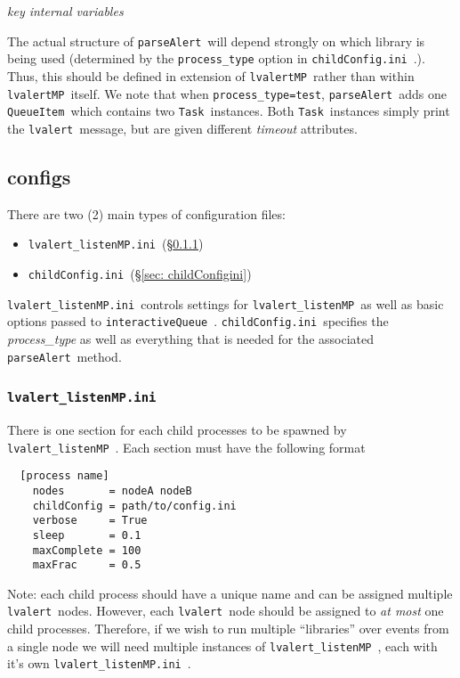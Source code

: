 \documentclass{article}
\newcommand{\alert}{\texttt{lvalert}~}
\newcommand{\lvalertMP}{\texttt{lvalertMP}~}
\newcommand{\lvalertListenMP}{\texttt{lvalert\_listenMP}~}
\newcommand{\interactiveQueue}{\texttt{interactiveQueue}~}
\newcommand{\parseAlert}{\texttt{parseAlert}~}
\newcommand{\QueueItem}{\texttt{QueueItem}~}
\newcommand{\Task}{\texttt{Task}~}
\newcommand{\lvalertMPini}{\texttt{lvalert\_listenMP.ini}~}
\newcommand{\childConfigini}{\texttt{childConfig.ini}~}
\begin{document}
\noindent
\textit{key internal variables}

The actual structure of \parseAlert will depend strongly on which library is being used (determined by the \texttt{process\_type} option in \childConfigini.). 
Thus, this should be defined in extension of \lvalertMP rather than within \lvalertMP itself.
We note that when \texttt{process\_type=test}, \parseAlert adds one \QueueItem which contains two \Task instances. 
Both \Task instances simply print the \alert message, but are given different \textit{timeout} attributes.


\subsection{configs}
\label{sec: configs}

There are two (2) main types of configuration files:

\begin{itemize}
    \item{\lvalertMPini (\S\ref{sec: lvalertMPini})}
    \item{\childConfigini (\S\ref{sec: childConfigini})}
\end{itemize}

\lvalertMPini controls settings for \lvalertListenMP as well as basic options passed to \interactiveQueue.
\childConfigini specifies the \textit{process\_type} as well as everything that is needed for the associated \parseAlert method.


\subsubsection{\lvalertMPini}
\label{sec: lvalertMPini}

There is one section for each child processes to be spawned by \lvalertListenMP.
Each section must have the following format

\begin{verbatim}
  [process name]
    nodes       = nodeA nodeB
    childConfig = path/to/config.ini
    verbose     = True
    sleep       = 0.1
    maxComplete = 100
    maxFrac     = 0.5
\end{verbatim}

Note: each child process should have a unique name and can be assigned multiple \alert nodes. 
However, each \alert node should be assigned to \textit{at most} one child processes. 
Therefore, if we wish to run multiple ``libraries'' over events from a single node we will need multiple instances of \lvalertListenMP, each with it's own \lvalertMPini.
\end{document}
